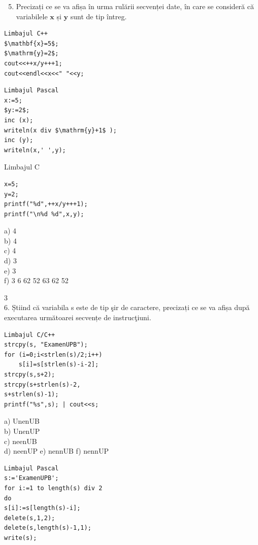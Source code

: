 \documentclass[10pt]{article}
\begin{document}
\begin{enumerate}
  \setcounter{enumi}{4}
  \item Precizați ce se va afișa în urma rulării secvenței date, în care se consideră că variabilele $\mathbf{x}$ și $\mathbf{y}$ sunt de tip întreg.
\end{enumerate}

\begin{verbatim}
Limbajul C++
$\mathbf{x}=5$;
$\mathrm{y}=2$;
cout<<++x/y+++1;
cout<<endl<<x<<" "<<y;
\end{verbatim}

\begin{verbatim}
Limbajul Pascal
x:=5;
$y:=2$;
inc (x);
writeln(x div $\mathrm{y}+1$ );
inc (y);
writeln(x,' ',y);
\end{verbatim}

Limbajul C

\begin{verbatim}
x=5;
y=2;
printf("%d",++x/y+++1);
printf("\n%d %d",x,y);
\end{verbatim}

a) 4\\
b) 4\\
c) 4\\
d) 3\\
e) 3\\
f) 3 6 62 52 63 62 52

3\\
6. Ș̦tiind că variabila s este de tip şir de caractere, precizați ce se va afișa după executarea următoarei secvențe de instrucţiuni.

\begin{verbatim}
Limbajul C/C++
strcpy(s, "ExamenUPB");
for (i=0;i<strlen(s)/2;i++)
    s[i]=s[strlen(s)-i-2];
strcpy(s,s+2);
strcpy(s+strlen(s)-2,
s+strlen(s)-1);
printf("%s",s); | cout<<s;
\end{verbatim}

a) UnenUB\\
b) UnenUP\\
c) neenUB\\
d) neenUP e) nennUB f) nennUP

\begin{verbatim}
Limbajul Pascal
s:='ExamenUPB';
for i:=1 to length(s) div 2
do
s[i]:=s[length(s)-i];
delete(s,1,2);
delete(s,length(s)-1,1);
write(s);
\end{verbatim}
\end{document}
